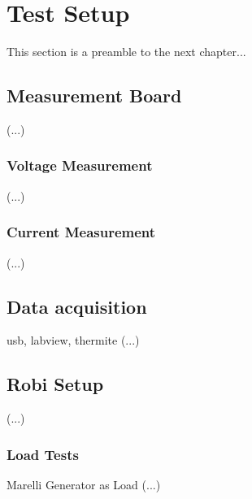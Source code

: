 \clearpage
\section{Test Setup}

This section is a preamble to the next chapter...

\subsection{Measurement Board}

(...)\\

\subsubsection{Voltage Measurement}

(...)\\

\subsubsection{Current Measurement}

(...)\\

\subsection{Data acquisition}
usb, labview, thermite
(...)\\

\subsection{Robi Setup}

(...)\\

\subsubsection{Load Tests}
Marelli Generator as Load
(...)\\
